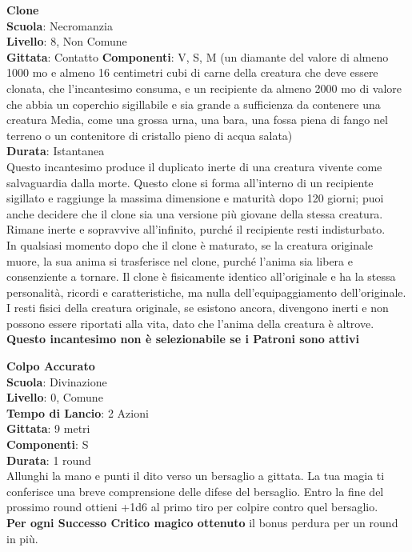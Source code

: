 \begin{multicols}{2}
\medskip\textbf{Clone}\\
\textbf{Scuola}: Necromanzia\\
\textbf{Livello}: 8, Non Comune\\
\textbf{Gittata}: Contatto
\textbf{Componenti}: V, S, M (un diamante del valore di almeno 1000 mo e almeno 16 centimetri cubi di carne della creatura che deve essere clonata, che l'incantesimo consuma, e un recipiente da almeno 2000 mo di valore che abbia un coperchio sigillabile e sia grande a sufficienza da contenere una creatura Media, come una grossa urna, una bara, una fossa piena di fango nel terreno o un contenitore di cristallo pieno di acqua salata)\\
\textbf{Durata}: Istantanea\\
Questo incantesimo produce il duplicato inerte di una creatura vivente come salvaguardia dalla morte. Questo clone si forma all'interno di un recipiente sigillato e raggiunge la massima dimensione e maturità dopo 120 giorni; puoi anche decidere che il clone sia una versione più giovane della stessa creatura. Rimane inerte e sopravvive all'infinito, purché il recipiente resti indisturbato.\\
In qualsiasi momento dopo che il clone è maturato, se la creatura originale muore, la sua anima si trasferisce nel clone, purché l'anima sia libera e consenziente a tornare. Il clone è fisicamente identico all'originale e ha la stessa personalità, ricordi e caratteristiche, ma nulla dell'equipaggiamento dell'originale. I resti fisici della creatura originale, se esistono ancora, divengono inerti e non possono essere riportati alla vita, dato che l'anima della creatura è altrove. \\
\textbf{Questo incantesimo non è selezionabile se i Patroni sono attivi}

\medskip\textbf{Colpo Accurato}\\
\textbf{Scuola}: Divinazione\\
\textbf{Livello}: 0, Comune\\
\textbf{Tempo di Lancio}: 2 Azioni\\
\textbf{Gittata}: 9 metri\\
\textbf{Componenti}: S\\
\textbf{Durata}: 1 round\\
Allunghi la mano e punti il dito verso un bersaglio a gittata. La tua magia ti conferisce una breve comprensione delle difese del bersaglio. Entro la fine del prossimo round ottieni +1d6 al primo tiro per colpire contro quel bersaglio.\\
\textbf{Per ogni Successo Critico magico ottenuto} il bonus perdura per un round in più.


\end{multicols}
